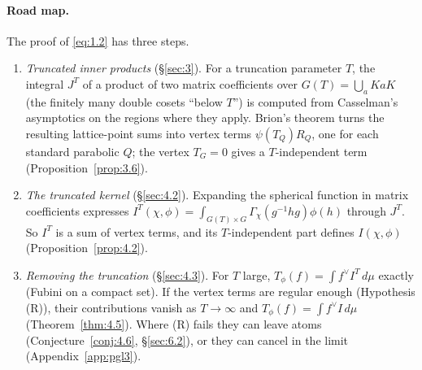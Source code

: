 \documentclass[12pt,letterpaper]{article}
\numberwithin{equation}{section}
\theoremstyle{plain}
\theoremstyle{remark}
\theoremstyle{plain}
\theoremstyle{definition}
\theoremstyle{remark}
\theoremstyle{remark}
\begin{document}
\paragraph{Road map.} The proof of \eqref{eq:1.2} has three steps.
\begin{enumerate}
\item \emph{Truncated inner products} (\S\ref{sec:3}). For a truncation parameter $T$, the integral $J^T$ of a product of two matrix coefficients over $G(T)=\bigcup_{a}KaK$ (the finitely many double cosets ``below $T$'') is computed from Casselman's asymptotics on the regions where they apply. Brion's theorem turns the resulting lattice-point sums into vertex terms $\psi(T_Q)R_Q$, one for each standard parabolic $Q$; the vertex $T_G=0$ gives a $T$-independent term (Proposition~\ref{prop:3.6}).
\item \emph{The truncated kernel} (\S\ref{sec:4.2}). Expanding the spherical function in matrix coefficients expresses $I^T(\chi,\phi)=\int_{G(T)\times G}\Gamma_\chi(g^{-1}hg)\phi(h)$ through $J^T$. So $I^T$ is a sum of vertex terms, and its $T$-independent part defines $I(\chi,\phi)$ (Proposition~\ref{prop:4.2}).
\item \emph{Removing the truncation} (\S\ref{sec:4.3}). For $T$ large, $T_\phi(f)=\int f^\vee I^T\,d\mu$ exactly (Fubini on a compact set). If the vertex terms are regular enough (Hypothesis (R)), their contributions vanish as $T\to\infty$ and $T_\phi(f)=\int f^\vee I\,d\mu$ (Theorem~\ref{thm:4.5}). Where (R) fails they can leave atoms (Conjecture~\ref{conj:4.6}, \S\ref{sec:6.2}), or they can cancel in the limit (Appendix~\ref{app:pgl3}).
\end{enumerate}
\end{document}
